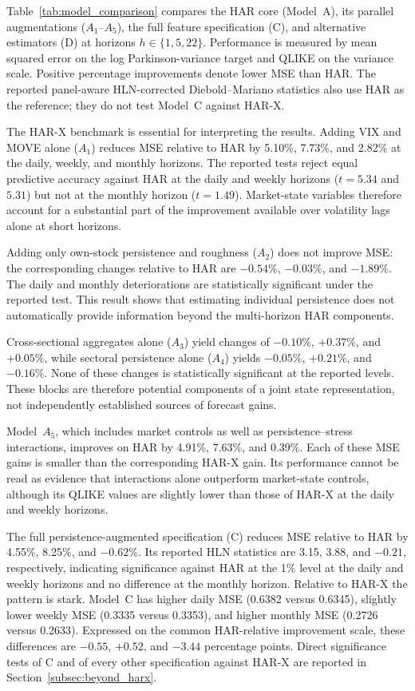 \documentclass[jrfm,article,submit,moreauthors,pdftex]{Definitions/mdpi}
\begin{document}
Table~\ref{tab:model_comparison} compares the HAR core (Model~A), its
parallel augmentations ($A_1$--$A_5$), the full feature specification (C),
and alternative estimators (D) at horizons $h\in\{1,5,22\}$. Performance is
measured by mean squared error on the log Parkinson-variance target and
QLIKE on the variance scale. Positive percentage improvements denote lower
MSE than HAR. The reported panel-aware HLN-corrected Diebold--Mariano
statistics also use HAR as the reference; they do not test Model~C against
HAR-X.



The HAR-X benchmark is essential for interpreting the results. Adding VIX
and MOVE alone ($A_1$) reduces MSE relative to HAR by 5.10\%, 7.73\%, and
2.82\% at the daily, weekly, and monthly horizons. The reported tests reject
equal predictive accuracy against HAR at the daily and weekly horizons
($t = 5.34$ and $5.31$) but not at the monthly horizon ($t = 1.49$).
Market-state variables therefore account for a substantial part of the
improvement available over volatility lags alone at short horizons.

Adding only own-stock persistence and roughness ($A_2$) does not improve
MSE: the corresponding changes relative to HAR are $-0.54\%$, $-0.03\%$,
and $-1.89\%$. The daily and monthly deteriorations are statistically
significant under the reported test. This result shows that estimating individual persistence does not
automatically provide information beyond the multi-horizon HAR components.

Cross-sectional aggregates alone ($A_3$) yield changes of $-0.10\%$,
$+0.37\%$, and $+0.05\%$, while sectoral persistence alone ($A_4$) yields
$-0.05\%$, $+0.21\%$, and $-0.16\%$. None of these changes is statistically
significant at the reported levels. These blocks are therefore potential components of a joint state
representation, not independently established sources of forecast gains.

Model~$A_5$, which includes market controls as well as persistence--stress
interactions, improves on HAR by 4.91\%, 7.63\%, and 0.39\%. Each of these
MSE gains is smaller than the corresponding HAR-X gain. Its performance
cannot be read as evidence that interactions alone outperform market-state
controls, although its QLIKE values are slightly lower than those of HAR-X
at the daily and weekly horizons.

The full persistence-augmented specification (C) reduces MSE relative to
HAR by 4.55\%, 8.25\%, and $-0.62\%$. Its reported HLN statistics are 3.15,
3.88, and $-0.21$, respectively, indicating significance against HAR at
the 1\% level at the daily and weekly horizons and no difference at the
monthly horizon. Relative to HAR-X the pattern is stark. Model~C has higher
daily MSE (0.6382 versus 0.6345), slightly lower weekly MSE (0.3335 versus
0.3353), and higher monthly MSE (0.2726 versus 0.2633). Expressed on the
common HAR-relative improvement scale, these differences are $-0.55$,
$+0.52$, and $-3.44$ percentage points. Direct significance tests of C and
of every other specification against HAR-X are reported in
Section~\ref{subsec:beyond_harx}.
\end{document}
